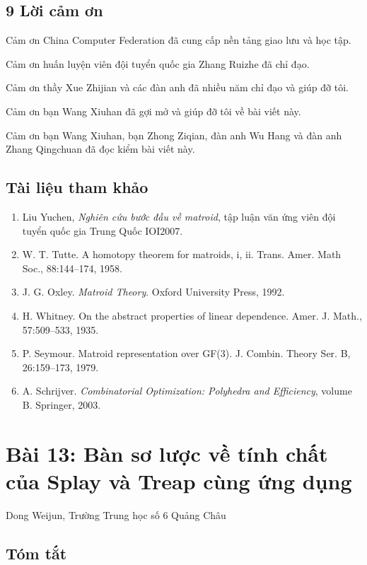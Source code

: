 \documentclass[11pt]{article}
\begin{document}
\subsection*{9 Lời cảm ơn}

Cảm ơn China Computer Federation đã cung cấp nền tảng giao lưu và học tập.

Cảm ơn huấn luyện viên đội tuyển quốc gia Zhang Ruizhe đã chỉ đạo.

Cảm ơn thầy Xue Zhijian và các đàn anh đã nhiều năm chỉ đạo và giúp đỡ tôi.

Cảm ơn bạn Wang Xiuhan đã gợi mở và giúp đỡ tôi về bài viết này.

Cảm ơn bạn Wang Xiuhan, bạn Zhong Ziqian, đàn anh Wu Hang và đàn anh Zhang
Qingchuan đã đọc kiểm bài viết này.

\subsection*{Tài liệu tham khảo}

\begin{enumerate}
  \item Liu Yuchen, \emph{Nghiên cứu bước đầu về matroid}, tập luận văn ứng viên
  đội tuyển quốc gia Trung Quốc IOI2007.
  \item W. T. Tutte. A homotopy theorem for matroids, i, ii. Trans. Amer. Math
  Soc., 88:144--174, 1958.
  \item J. G. Oxley. \emph{Matroid Theory}. Oxford University Press, 1992.
  \item H. Whitney. On the abstract properties of linear dependence. Amer. J.
  Math., 57:509--533, 1935.
  \item P. Seymour. Matroid representation over GF(3). J. Combin. Theory Ser.
  B, 26:159--173, 1979.
  \item A. Schrijver. \emph{Combinatorial Optimization: Polyhedra and
  Efficiency}, volume B. Springer, 2003.
\end{enumerate}

\section{Bài 13: Bàn sơ lược về tính chất của Splay và Treap cùng ứng dụng}

\begin{center}
Dong Weijun, Trường Trung học số 6 Quảng Châu
\end{center}

\subsection*{Tóm tắt}
\end{document}
